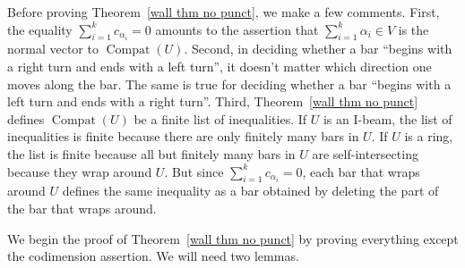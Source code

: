 \documentclass{amsart}
\theoremstyle{definition}
\theoremstyle{remark}
\numberwithin{equation}{section}
\newcommand{\0}{{\mathbf{0}}}
\newcommand{\Compat}{\operatorname{Compat}}
\begin{document}
Before proving Theorem~\ref{wall thm no punct}, we make a few comments.
First, the equality $\sum_{i=1}^kc_{\alpha_i}{=0}$ amounts to the assertion that $\sum_{i=1}^k\alpha_i\in V$ is the normal vector to $\Compat(U)$.
Second, in deciding whether a bar ``begins with a right turn and ends with a left turn'', it doesn't matter which direction one moves along the bar.
The same is true for deciding whether a bar ``begins with a left turn and ends with a right turn''.
Third, Theorem~\ref{wall thm no punct} defines $\Compat(U)$ be a finite list of inequalities.
If $U$ is an I-beam, the list of inequalities is finite because there are only finitely many bars in $U$.
If $U$ is a ring, the list is finite because all but finitely many bars in $U$ are self-intersecting because they wrap around $U$.  
But since $\sum_{i=1}^kc_{\alpha_i}=0$, each bar that wraps around $U$ defines the same inequality as a bar obtained by deleting the part of the bar that wraps around.

We begin the proof of Theorem~\ref{wall thm no punct} by proving everything except the codimension assertion.
We will need two lemmas.
\end{document}
